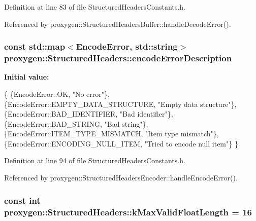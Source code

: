 Definition at line 83 of file Structured\+Headers\+Constants.\+h.



Referenced by proxygen\+::\+Structured\+Headers\+Buffer\+::handle\+Decode\+Error().

\subsubsection[{encode\+Error\+Description}]{\setlength{\rightskip}{0pt plus 5cm}const std\+::map$<${\bf Encode\+Error}, std\+::string$>$ proxygen\+::\+Structured\+Headers\+::encode\+Error\+Description\hspace{0.3cm}{\ttfamily [static]}}\label{namespaceproxygen_1_1StructuredHeaders_ae7b91a2067c03c208fc35ce8883b53ec}
{\bfseries Initial value\+:}
\begin{DoxyCode}
\{
    \{EncodeError::OK, \textcolor{stringliteral}{"No error"}\},
    \{EncodeError::EMPTY\_DATA\_STRUCTURE, \textcolor{stringliteral}{"Empty data structure"}\},
    \{EncodeError::BAD\_IDENTIFIER, \textcolor{stringliteral}{"Bad identifier"}\},
    \{EncodeError::BAD\_STRING, \textcolor{stringliteral}{"Bad string"}\},
    \{EncodeError::ITEM\_TYPE\_MISMATCH, \textcolor{stringliteral}{"Item type mismatch"}\},
    \{EncodeError::ENCODING\_NULL\_ITEM, \textcolor{stringliteral}{"Tried to encode null item"}\}
\}
\end{DoxyCode}


Definition at line 94 of file Structured\+Headers\+Constants.\+h.



Referenced by proxygen\+::\+Structured\+Headers\+Encoder\+::handle\+Encode\+Error().

\subsubsection[{k\+Max\+Valid\+Float\+Length}]{\setlength{\rightskip}{0pt plus 5cm}const int proxygen\+::\+Structured\+Headers\+::k\+Max\+Valid\+Float\+Length = 16\hspace{0.3cm}{\ttfamily [static]}}\label{namespaceproxygen_1_1StructuredHeaders_a7dc35307c00ef16631037e84c4549f34}


